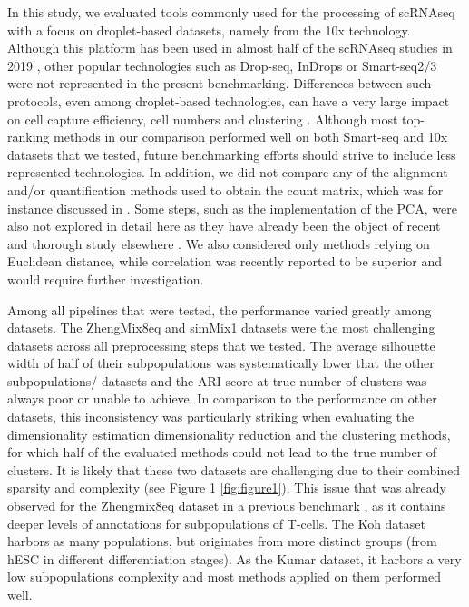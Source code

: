 \documentclass{bmcart}
\begin{document}
In this study, we evaluated tools commonly used for the processing of scRNAseq with a focus on droplet-based datasets, namely from the 10x technology. Although this platform has been used in almost half of the scRNAseq studies in 2019 \cite{SvenssonDB2019}, other popular technologies such as Drop-seq, InDrops or Smart-seq2/3 were not represented in the present benchmarking. Differences between such protocols, even among droplet-based technologies, can have a very large impact on cell capture efficiency, cell numbers and clustering \cite{MereuCellAtlas2019, ZhangDroplet2019, SalomonDroplet2019}. Although most top-ranking methods in our comparison performed well on both Smart-seq and 10x datasets that we tested, future benchmarking efforts should strive to include less represented technologies. In addition, we did not compare any of the alignment and/or quantification methods used to obtain the count matrix, which was for instance discussed in \cite{viethSystematic2019}. Some steps, such as the implementation of the PCA, were also not explored in detail here as they have already been the object of recent and thorough study elsewhere \cite{SunDimRed2019, TsuyuzakiPCA2020}. We also considered only methods relying on Euclidean distance, while correlation was recently reported to be superior\cite{kim_impact_2019} and would require further investigation.

Among all pipelines that were tested, the performance varied greatly among datasets. The ZhengMix8eq and simMix1 datasets were the most challenging datasets across all preprocessing steps that we tested. The average silhouette width of half of their subpopulations was systematically lower that the other subpopulations/ datasets and the ARI score at true number of clusters was always poor or unable to achieve. In comparison to the performance on other datasets, this inconsistency was particularly striking when evaluating the dimensionality estimation dimensionality reduction and the clustering methods, for which half of the evaluated methods could not lead to the true number of clusters. It is likely that these two datasets are challenging due to their combined sparsity and complexity (see Figure 1 \ref{fig:figure1}). This issue that was already observed for the Zhengmix8eq dataset in a previous benchmark \cite{duoClustering2018}, as it contains deeper levels of annotations for subpopulations of T-cells. The Koh dataset harbors as many populations, but originates from more distinct groups (from hESC in different differentiation stages). As the Kumar dataset, it harbors a very low subpopulations complexity and most methods applied on them performed well.
\end{document}
